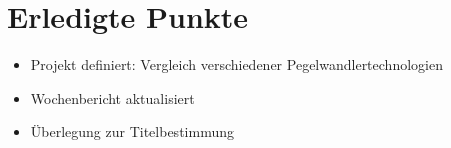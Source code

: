 \section{Erledigte Punkte}

\begin{itemize}
  \item Projekt definiert: Vergleich verschiedener Pegelwandlertechnologien
  \item Wochenbericht aktualisiert
  \item Überlegung zur Titelbestimmung
\end{itemize}

